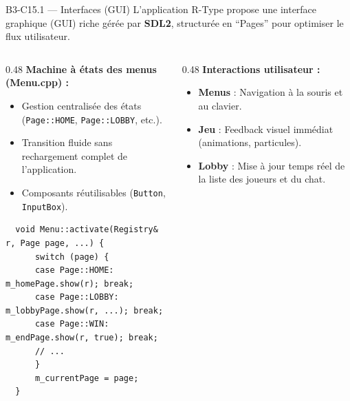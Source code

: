 \documentclass[aspectratio=169,10pt]{beamer}
\begin{document}
\begin{frame}[fragile]{B3-C15.1 — Interfaces (GUI)}
  \footnotesize
  L'application R-Type propose une interface graphique (GUI) riche gérée par \textbf{SDL2}, structurée en ``Pages'' pour optimiser le flux utilisateur.
  
  \begin{columns}[T]
  \begin{column}{0.48\textwidth}
  \textbf{Machine à états des menus (Menu.cpp) :}
  \begin{itemize}
    \item Gestion centralisée des états (\texttt{Page::HOME}, \texttt{Page::LOBBY}, etc.).
    \item Transition fluide sans rechargement complet de l'application.
    \item Composants réutilisables (\texttt{Button}, \texttt{InputBox}).
  \end{itemize}
  
  \vspace{0.2em}
  \begin{lstlisting}
  void Menu::activate(Registry& r, Page page, ...) {
      switch (page) {
      case Page::HOME: m_homePage.show(r); break;
      case Page::LOBBY: m_lobbyPage.show(r, ...); break;
      case Page::WIN: m_endPage.show(r, true); break;
      // ...
      }
      m_currentPage = page;
  }
  \end{lstlisting}
  \end{column}
  
  \begin{column}{0.48\textwidth}
  \textbf{Interactions utilisateur :}
  \begin{itemize}
    \item \textbf{Menus} : Navigation à la souris et au clavier.
    \item \textbf{Jeu} : Feedback visuel immédiat (animations, particules).
    \item \textbf{Lobby} : Mise à jour temps réel de la liste des joueurs et du chat.
  \end{itemize}
  
  \vspace{0.2em}
  \centering
\end{column}
\end{columns}
\end{frame}
\end{document}
